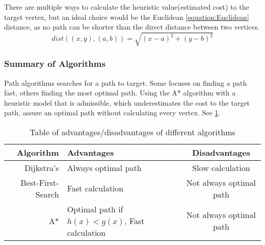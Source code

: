   There are multiple ways to calculate the heuristic value(estimated cost) to the target vertex, but an ideal choice would be the Euclidean \cref{equation:Euclidean} distance, as no path can be shorter than the direct distance between two vertices.
  \begin{equation} \label{equation:Euclidean}
    dist((x, y), (a, b)) = \sqrt{(x - a)^2 + (y - b)^2}
  \end{equation}

  \subsubsection{Summary of Algorithms}

  Path algorithms searches for a path to target. Some focuses on finding a path fast, others finding the most optimal path. Using the A* algorithm with a heuristic model that is admissible, which underestimates the cost to the target path, assure an optimal path without calculating every vertex. See \cref{tbl:scheme}.
  
  \begin{table}[ht!]
    \centering
    \begin{tabular}{|r|l|c|}

      \hline
      \textbf{Algorithm} & \textbf{Advantages} & \textbf{Disadvantages} \\
      \hline
      Dijkstra's & Always optimal path & Slow calculation \\
      Best-First-Search & Fast calculation & Not always optimal path \\
      A* & Optimal path if $h(x)<g(x)$, Fast calculation & Not always optimal path \\
      \hline
    \end{tabular}
    \caption{Table of advantages/disadvantages of different algorithms}
    \label{tbl:scheme}
  \end{table}